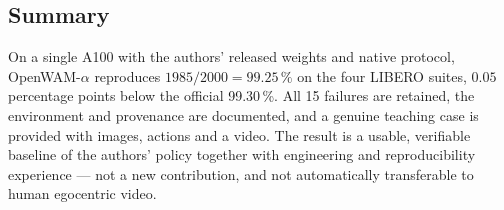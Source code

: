 \subsection{Summary}
\label{sec:owa-summary}

On a single A100 with the authors' released weights and native protocol,
OpenWAM-$\alpha$ reproduces $1985/2000 = 99.25\,\%$ on the four LIBERO suites,
$0.05$ percentage points below the official 99.30\,\%. All 15 failures are
retained, the environment and provenance are documented, and a genuine teaching
case is provided with images, actions and a video. The result is a usable,
verifiable baseline of the authors' policy together with engineering and
reproducibility experience --- not a new contribution, and not automatically
transferable to human egocentric video.
